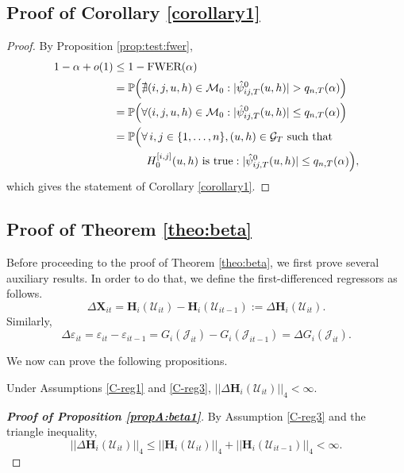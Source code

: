 \documentclass[a4paper,12pt]{article}
\begin{document}
\subsection{Proof of Corollary \ref{corollary1}}\label{subsec:app:corollary}
\begin{proof}
By Proposition \ref{prop:test:fwer}, 
\begin{align*}
1 - \alpha + o(1) 
 & \le 1 - \textnormal{FWER}(\alpha) \\
 & = \mathbb{P} \Big( \nexists (i,j,u, h) \in \mathcal{M}_0: |\hat{\psi}^0_{ij,T}(u, h)| > q_{n, T}(\alpha) \Big) \\
& = \mathbb{P}\Big( \forall (i,j,u, h) \in \mathcal{M}_0: |\hat{\psi}^0_{ij,T}(u, h)| \le q_{n, T}(\alpha) \Big)\\
&=\mathbb{P}\Big( \forall \, i,j \in \{1, \ldots, n\}, (u, h) \in \mathcal{G}_T \text{ such that }\\
&\quad\quad \quad H_0^{[i, j]}(u, h) \text{ is true}: |\hat{\psi}^0_{ij,T}(u, h)| \le q_{n,T}(\alpha) \Big),
\end{align*}
which gives the statement of Corollary \ref{corollary1}.
\end{proof}



\subsection{Proof of Theorem \ref{theo:beta}}\label{subsec:app:beta}

Before proceeding to the proof of Theorem \ref{theo:beta}, we first prove several auxiliary results. In order to do that, we define the first-differenced regressors as follows.
\[ \Delta \mathbf{X}_{it} =\mathbf{H}_i(\mathcal{U}_{it}) - \mathbf{H}_i(\mathcal{U}_{it-1}) := \Delta \mathbf{H}_i(\mathcal{U}_{it}). \]
Similarly, 
\[\Delta \varepsilon_{it} = \varepsilon_{it} - \varepsilon_{it-1} = G_i(\mathcal{J}_{it}) - G_i(\mathcal{J}_{it-1}) = \Delta G_i(\mathcal{J}_{it}).
\]
 
We now can prove the following propositions.
\begin{propA}\label{propA:beta1}
Under Assumptions \ref{C-reg1} and \ref{C-reg3}, $|| \Delta \mathbf{H}_i(\mathcal{U}_{it})||_4 < \infty$.
\end{propA}



\begin{proof}[\textnormal{\textbf{Proof of Proposition \ref{propA:beta1}}}]
By Assumption \ref{C-reg3} and the triangle inequality,
\[
 || \Delta \mathbf{H}_i(\mathcal{U}_{it})||_4 \leq  ||\mathbf{H}_i(\mathcal{U}_{it})||_4 +  || \mathbf{H}_i(\mathcal{U}_{it-1})||_4 < \infty.
\]
\end{proof} 
\end{document}
